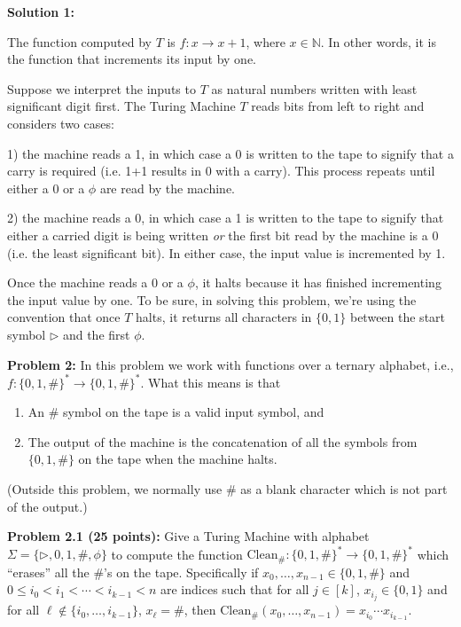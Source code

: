 \documentclass[11pt]{article}
\begin{document}
\textbf{Solution 1:} 

The function computed by $T$ is $f: x \to x+1$, where $x \in \mathbb{N}$. In other words, it is the function that increments its input by one. 

Suppose we interpret the inputs to $T$ as natural numbers written with least significant digit first. The Turing Machine $T$ reads bits from left to right and considers two cases:

1) the machine reads a 1, in which case a 0 is written to the tape to signify that a carry is required (i.e. 1+1 results in 0 with a carry). This process repeats until either a $0$ or a $\phi$ are read by the machine.

2) the machine reads a 0, in which case a 1 is written to the tape to signify that either a carried digit is being written \textit{or} the first bit read by the machine is a 0 (i.e. the least significant bit). In either case, the input value is incremented by 1.

Once the machine reads a 0 or a $\phi$, it halts because it has finished incrementing the input value by one. To be sure, in solving this problem, we're using the convention that once $T$ halts, it returns all characters in $\{0, 1\}$ between the start symbol $\triangleright$ and the first $\phi$.

\newpage

\textbf{Problem 2:} In this problem we work with functions over a ternary alphabet, i.e., $f:\{0,1,\#\}^* \to  \{0,1,\#\}^*$. What this means is that
\begin{enumerate}
\item An $\#$ symbol on the tape is a valid input symbol, and 
\item The output of the machine is the concatenation of all the symbols from $\{0,1,\#\}$ on the tape when the machine halts. 
\end{enumerate}
(Outside this problem, we normally use $\#$ as a blank character which is not part of the output.)

\newcommand{\Clean}{\mathrm{Clean}}

\textbf{Problem 2.1 (25 points):} Give a Turing Machine with alphabet $\Sigma = \{\triangleright, 0,1, \#, \phi\}$ to compute the function $\Clean_\#:\{0,1,\#\}^* \to \{0,1,\#\}^*$ which ``erases'' all the $\#$'s on the tape. Specifically if $x_0,\ldots,x_{n-1} \in \{0,1,\#\}$ and $0 \leq i_0 < i_1 < \cdots < i_{k-1} < n$ are indices such that for all $j \in [k]$, $x_{i_j} \in \{0,1\}$ and for all $\ell \not\in \{i_0,\ldots,i_{k-1}\}$, $x_\ell = \#$, then $\Clean_\#(x_0,\ldots,x_{n-1}) = x_{i_0}\cdots x_{i_{k-1}}$. 
\end{document}
